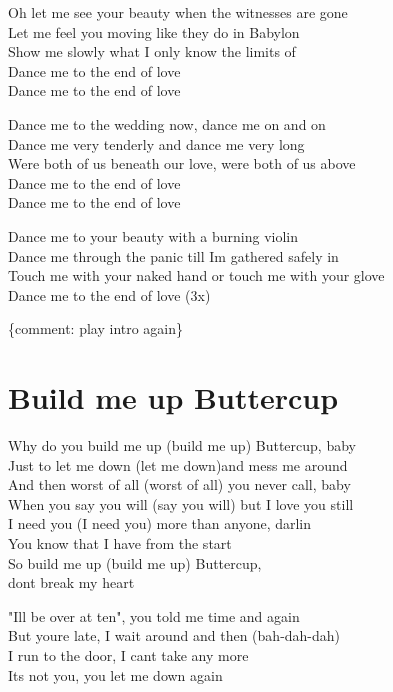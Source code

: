 \documentclass[
  letterpaper,
]{scrbook}
\begin{document}
Oh let me see your beauty when the witnesses are gone\\
Let me feel you moving like they do in Babylon\\
Show me slowly what I only know the limits of\\
Dance me to the end of love\\
Dance me to the end of love

Dance me to the wedding now, dance me on and on\\
Dance me very tenderly and dance me very long\\
We\textquotesingle re both of us beneath our love, we\textquotesingle re
both of us above\\
Dance me to the end of love\\
Dance me to the end of love

Dance me to your beauty with a burning violin\\
Dance me through the panic till I\textquotesingle m gathered safely in\\
Touch me with your naked hand or touch me with your glove\\
Dance me to the end of love (3x)

\{comment: play intro again\}

\hypertarget{build-me-up-buttercup}{%
\chapter{Build me up Buttercup}\label{build-me-up-buttercup}}

Why do you build me up (build me up) Buttercup, baby\\
Just to let me down (let me down)and mess me around\\
And then worst of all (worst of all) you never call, baby\\
When you say you will (say you will) but I love you still\\
I need you (I need you) more than anyone, darlin\textquotesingle{}\\
You know that I have from the start\\
So build me up (build me up) Buttercup,\\
don\textquotesingle t break my heart

"I\textquotesingle ll be over at ten", you told me time and again\\
But you\textquotesingle re late, I wait around and then (bah-dah-dah)\\
I run to the door, I can\textquotesingle t take any more\\
It\textquotesingle s not you, you let me down again
\end{document}
